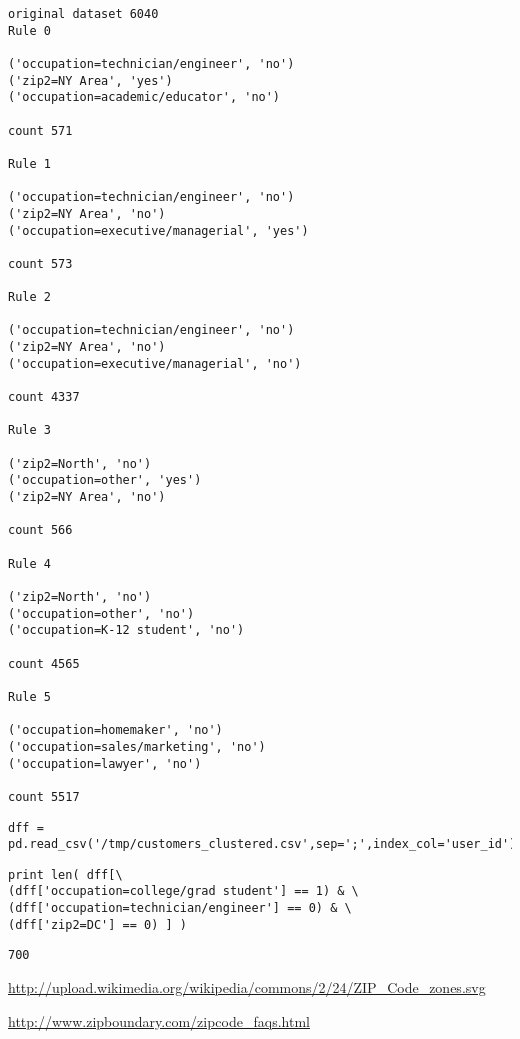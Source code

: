 \documentclass[12pt,fleqn]{article}\usepackage{../common}
\begin{document}
\begin{verbatim}
original dataset 6040
Rule 0

('occupation=technician/engineer', 'no')
('zip2=NY Area', 'yes')
('occupation=academic/educator', 'no')

count 571

Rule 1

('occupation=technician/engineer', 'no')
('zip2=NY Area', 'no')
('occupation=executive/managerial', 'yes')

count 573

Rule 2

('occupation=technician/engineer', 'no')
('zip2=NY Area', 'no')
('occupation=executive/managerial', 'no')

count 4337

Rule 3

('zip2=North', 'no')
('occupation=other', 'yes')
('zip2=NY Area', 'no')

count 566

Rule 4

('zip2=North', 'no')
('occupation=other', 'no')
('occupation=K-12 student', 'no')

count 4565

Rule 5

('occupation=homemaker', 'no')
('occupation=sales/marketing', 'no')
('occupation=lawyer', 'no')

count 5517

\end{verbatim}

\begin{verbatim}
dff = pd.read_csv('/tmp/customers_clustered.csv',sep=';',index_col='user_id')
\end{verbatim}

\begin{verbatim}
print len( dff[\
(dff['occupation=college/grad student'] == 1) & \
(dff['occupation=technician/engineer'] == 0) & \
(dff['zip2=DC'] == 0) ] )
\end{verbatim}

\begin{verbatim}
700
\end{verbatim}




\url{http://upload.wikimedia.org/wikipedia/commons/2/24/ZIP_Code_zones.svg}

\url{http://www.zipboundary.com/zipcode_faqs.html}
\end{document}
